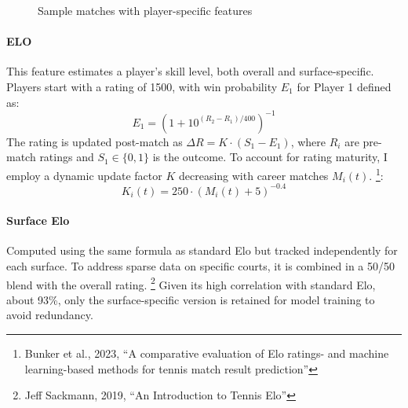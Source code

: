 \begin{figure}[ht]
    \centering
    \caption{Sample matches with player-specific features}
    \label{fig:matchup_features}
\end{figure}

\paragraph{ELO} This feature estimates a player's skill level, both overall and surface-specific. Players start with a rating of 1500, with win probability $E_1$ for Player 1 defined as:
\begin{equation*}
    E_1 = (1 + 10^{(R_2 - R_1)/400})^{-1}
\end{equation*}
The rating is updated post-match as $\Delta R = K \cdot (S_1 - E_1)$, where $R_i$ are pre-match ratings and $S_1 \in \{0, 1\}$ is the outcome. To account for rating maturity, I employ a dynamic update factor $K$ decreasing with career matches $M_i(t)$. \footnote{Bunker et al., 2023, ``A comparative evaluation of Elo ratings- and machine learning-based methods for tennis match result prediction''}:
\begin{equation*}
    K_i(t) = 250 \cdot (M_i(t) + 5)^{-0.4}
\end{equation*}

\paragraph{Surface Elo} Computed using the same formula as standard Elo but tracked independently for each surface. To address sparse data on specific courts, it is combined in a 50/50 blend with the overall rating. \footnote{Jeff Sackmann, 2019, ``An Introduction to Tennis Elo''}
Given its high correlation with standard Elo, about 93\%, only the surface-specific version is retained for model training to avoid redundancy.

